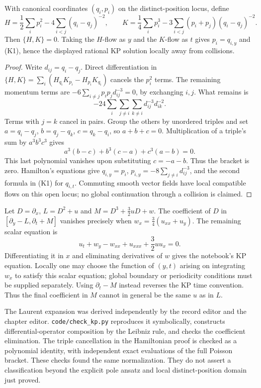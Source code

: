\begin{proposition}\ours
With canonical coordinates \((q_i,p_i)\) on the distinct-position locus,
define
\[
 H=\frac12\sum_i p_i^2-4\sum_{i<j}(q_i-q_j)^{-2},\qquad
 K=\frac14\sum_i p_i^3-3\sum_{i<j}(p_i+p_j)(q_i-q_j)^{-2}.
 \tag{K2}
\]
Then \(\{H,K\}=0\). Taking the \(H\)-flow as \(y\) and the \(K\)-flow
as \(t\) gives \(p_i=q_{i,y}\) and (K1), hence the displayed rational KP
solution locally away from collisions.
\end{proposition}
\begin{proof}
Write \(d_{ij}=q_i-q_j\). Direct differentiation in
\(\{H,K\}=\sum_i(H_{q_i}K_{p_i}-H_{p_i}K_{q_i})\) cancels the
\(p_i^2\) terms. The remaining momentum terms are
\(-6\sum_{i\ne j}p_ip_jd_{ij}^{-3}=0\), by exchanging \(i,j\).
What remains is
\[
 -24\sum_i\sum_{j\ne i}\sum_{k\ne i}d_{ij}^{-3}d_{ik}^{-2}.
\]
Terms with \(j=k\) cancel in pairs. Group the others by unordered triples
and set \(a=q_i-q_j\), \(b=q_j-q_k\), \(c=q_k-q_i\), so
\(a+b+c=0\). Multiplication of a triple's sum by \(a^3b^3c^3\) gives
\[
 a^3(b-c)+b^3(c-a)+c^3(a-b)=0.
\]
This last polynomial vanishes upon substituting \(c=-a-b\). Thus the
bracket is zero. Hamilton's equations give
\(q_{i,y}=p_i\), \(p_{i,y}=-8\sum_{j\ne i}d_{ij}^{-3}\), and the
second formula in (K1) for \(q_{i,t}\). Commuting smooth vector fields have
local compatible flows on this open locus; no global continuation through
a collision is claimed.
\end{proof}

\begin{remark}\oursComputed
Let \(D=\partial_x\), \(L=D^2+u\) and
\(M=D^3+\frac32uD+w\). The coefficient of \(D\) in
\([\partial_y-L,\partial_t+M]\) vanishes precisely when
\(w_x=\frac34(u_{xx}+u_y)\). The remaining scalar equation is
\[
 u_t+w_y-w_{xx}+u_{xxx}+\frac32uu_x=0.
\]
Differentiating it in \(x\) and eliminating derivatives of \(w\) gives
the notebook's KP equation. Locally one may choose the function of
\((y,t)\) arising on integrating \(w_x\) to satisfy this scalar equation;
global boundary or periodicity conditions must be supplied separately.
Using \(\partial_t-M\) instead reverses the KP time convention. Thus the
final coefficient in \(M\) cannot in general be the same \(u\) as in \(L\).
\end{remark}

The Laurent expansion was derived independently by the record editor and
the chapter editor. \texttt{code/check\_kp.py} reproduces it symbolically,
constructs differential-operator composition by the Leibniz rule, and
checks the coefficient elimination. The triple cancellation in the
Hamiltonian proof is checked as a polynomial identity, with independent
exact evaluations of the full Poisson bracket. These checks found the
same normalization. They do not assert a classification beyond the
explicit pole ansatz and local distinct-position domain just proved.
